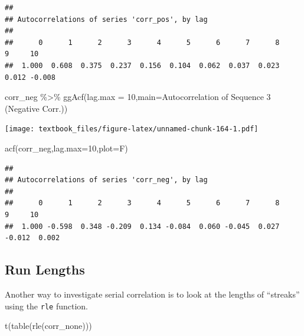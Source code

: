 \documentclass[
  11pt,
]{book}
\newenvironment{Shaded}{\begin{snugshade}}{\end{snugshade}}
\newcommand{\AttributeTok}[1]{\textcolor[rgb]{0.77,0.63,0.00}{#1}}
\newcommand{\DecValTok}[1]{\textcolor[rgb]{0.00,0.00,0.81}{#1}}
\newcommand{\FunctionTok}[1]{\textcolor[rgb]{0.00,0.00,0.00}{#1}}
\newcommand{\NormalTok}[1]{#1}
\newcommand{\SpecialCharTok}[1]{\textcolor[rgb]{0.00,0.00,0.00}{#1}}
\newcommand{\StringTok}[1]{\textcolor[rgb]{0.31,0.60,0.02}{#1}}
\theoremstyle{definition}
\theoremstyle{definition}
\theoremstyle{definition}
\theoremstyle{definition}
\theoremstyle{remark}
\begin{document}
\begin{verbatim}
## 
## Autocorrelations of series 'corr_pos', by lag
## 
##      0      1      2      3      4      5      6      7      8      9     10 
##  1.000  0.608  0.375  0.237  0.156  0.104  0.062  0.037  0.023  0.012 -0.008
\end{verbatim}

\newpage

\begin{Shaded}
\begin{Highlighting}[]
\NormalTok{corr\_neg }\SpecialCharTok{\%\textgreater{}\%} \FunctionTok{ggAcf}\NormalTok{(}\AttributeTok{lag.max =} \DecValTok{10}\NormalTok{,}\AttributeTok{main=}\StringTok{\textquotesingle{}Autocorrelation of Sequence 3 (Negative Corr.)\textquotesingle{}}\NormalTok{)}
\end{Highlighting}
\end{Shaded}

\texttt{[image: textbook\_files/figure-latex/unnamed-chunk-164-1.pdf]}

\begin{Shaded}
\begin{Highlighting}[]
\FunctionTok{acf}\NormalTok{(corr\_neg,}\AttributeTok{lag.max=}\DecValTok{10}\NormalTok{,}\AttributeTok{plot=}\NormalTok{F)}
\end{Highlighting}
\end{Shaded}

\begin{verbatim}
## 
## Autocorrelations of series 'corr_neg', by lag
## 
##      0      1      2      3      4      5      6      7      8      9     10 
##  1.000 -0.598  0.348 -0.209  0.134 -0.084  0.060 -0.045  0.027 -0.012  0.002
\end{verbatim}

\newpage

\hypertarget{run-lengths}{%
\subsection{Run Lengths}\label{run-lengths}}

Another way to investigate serial correlation is to look at the lengths of ``streaks'' using the \texttt{rle} function.

\begin{Shaded}
\begin{Highlighting}[]
\FunctionTok{t}\NormalTok{(}\FunctionTok{table}\NormalTok{(}\FunctionTok{rle}\NormalTok{(corr\_none)))}
\end{Highlighting}
\end{Shaded}
\end{document}
